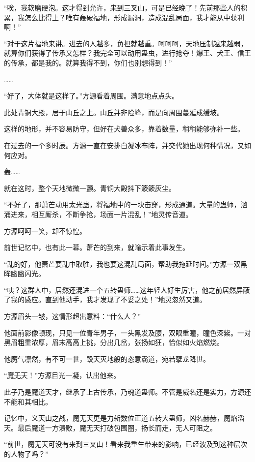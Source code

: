 \begin{this_body}
“唉，我软磨硬泡。这才得到允许，来到三叉山，可是已经晚了！先前那些人的积累，我怎么比得上？唯有轰破福地，形成漏洞，造成混乱局面，我才能从中获利啊！”

“对于这片福地来讲。进去的人越多，负担就越重。呵呵呵，天地压制越来越弱，就算你们获得了传承又怎样？我完全可以动用蛊虫，进行抢夺！爆王、犬王、信王的传承，都是我的。就算我得不到，你们也别想得到！”

……

“好了，大体就是这样了。”方源看着周围。满意地点点头。

此处青铜大殿，居于山丘之上。山丘并非险峰，而是向周围蔓延成缓坡。

这样的地形，并不容易防守，但好在犬兽众多，靠着数量，稍稍能够弥补一些。

在过去的一个多时辰。方源一直在安排白凝冰布阵，并交代她出现何种情况，又如何应对。

轰……

就在这时，整个天地微微一颤。青铜大殿抖下簌簌灰尘。

“不好了，那萧芒动用太光蛊，将福地中的一块击穿，形成通道。大量的蛊师，汹涌进来，相互厮杀，不断争抢，场面一片混乱！”地灵传音道。

方源呵呵一笑，却不惊惶。

前世记忆中，也有此一幕。萧芒的到来，就喻示着此事发生。

“乱的好，他萧芒要乱中取胜，我也要这混乱局面，帮助我拖延时间。”方源一双黑眸幽幽闪光。

“咦？这群人中，居然还混进一个五转蛊师……这年轻人好生厉害，他之前居然屏蔽了我的感应。直到他动手，我才发现了不妥之处！”地灵忽然又道。

方源眉头一皱，这情形超出意料：“什么人？”

他面前影像顿现，只见一位青年男子，一头黑发及腰，双眼重瞳，瞳色深紫。一对黑眉粗重浓厚，眉末高高上挑，分出几岔，张扬如狂，恰似如火焰燃烧。

他魔气凛然，有不可一世，毁天灭地般的恣意霸道，宛若孽龙降世。

“魔无天！”方源目光一凝，认出他来。

此子乃是魔道天才，继承了上古传承，乃魂道蛊师。不管是威名还是实力，方源还不能和其相比。

记忆中，义天山之战，魔无天更是力斩数位正道五转大蛊师，凶名赫赫，魔焰滔天。最后魔道一方溃败，魔无天打破包围圈，扬长而走，无人可阻之。

“前世，魔无天可没有来到三叉山！看来我重生带来的影响，已经波及到这种层次的人物了吗？”


\end{this_body}
